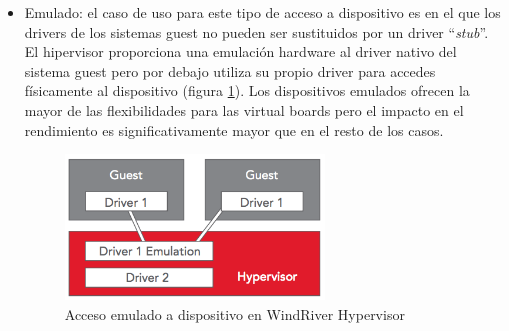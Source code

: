 \begin{itemize}
  \item Emulado: el caso de uso para este tipo de acceso a dispositivo es en el que los drivers de los sistemas guest no pueden ser sustituidos por un driver ``\textit{stub}''. El hipervisor proporciona una emulación hardware al driver nativo del sistema guest pero por debajo utiliza su propio driver para accedes físicamente al dispositivo (figura \ref{fig:windriver_drv_3}). Los dispositivos emulados ofrecen la mayor de las flexibilidades para las virtual boards pero el impacto en el rendimiento es significativamente mayor que en el resto de los casos.
  \begin{figure}[!htb]
  	\centering
  	\includegraphics[width=0.65\textwidth]{recursos/windriver_drv_3.png}
  	\caption{Acceso emulado a dispositivo en WindRiver Hypervisor}
  	\label{fig:windriver_drv_3}
  \end{figure}

\end{itemize}

